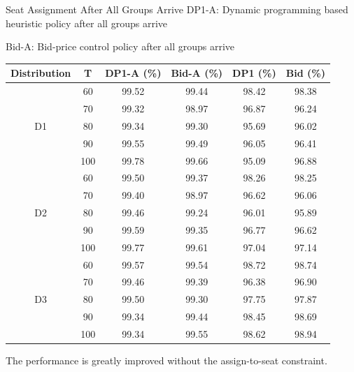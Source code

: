       \begin{frame}{Seat Assignment After All Groups Arrive}
        \scriptsize
        DP1-A: Dynamic programming based heuristic policy after all groups arrive
        
        Bid-A: Bid-price control policy after all groups arrive
        \begin{table}[ht]
          \centering
          \begin{tabular}{|c|c|c|c|c|c|}
          \hline
          Distribution & T  & {\color{red}DP1-A} (\%) & {\color{red}Bid-A} (\%) & DP1 (\%) & Bid (\%) \\
          \hline
          \multirow{5}{*}{D1} & 60    & 99.52 & 99.44 & 98.42 & 98.38 \\
          & 70  &    99.32 & 98.97 & 96.87 & 96.24 \\
          & 80  &    99.34 & 99.30 & 95.69 & 96.02 \\
          & 90  &    99.55 & 99.49 & 96.05 & 96.41  \\
          & 100 &    99.78 & 99.66 & 95.09 & 96.88 \\
          \hline
          \multirow{5}{*}{D2} & 60   & 99.50 & 99.37 & 98.26 & 98.25  \\
          & 70  &   99.40 & 98.97 & 96.62 & 96.06 \\
          & 80  &    99.46 & 99.24 & 96.01 & 95.89 \\
          & 90  &    99.59 & 99.35 & 96.77 & 96.62 \\
          & 100 &    99.77 & 99.61 & 97.04 & 97.14  \\
          \hline
          \multirow{5}{*}{D3} & 60   & 99.57 & 99.54 & 98.72 & 98.74 \\
          & 70  &    99.46 & 99.39  & 96.38 & 96.90 \\
          & 80  &    99.50 & 99.30  & 97.75 & 97.87 \\
          & 90  &    99.34 & 99.44  & 98.45 & 98.69 \\
          & 100 &    99.34 & 99.55  & 98.62 & 98.94 \\
          \hline
          \end{tabular}
        \end{table}
      The performance is greatly improved without the assign-to-seat constraint.  
    \end{frame}

